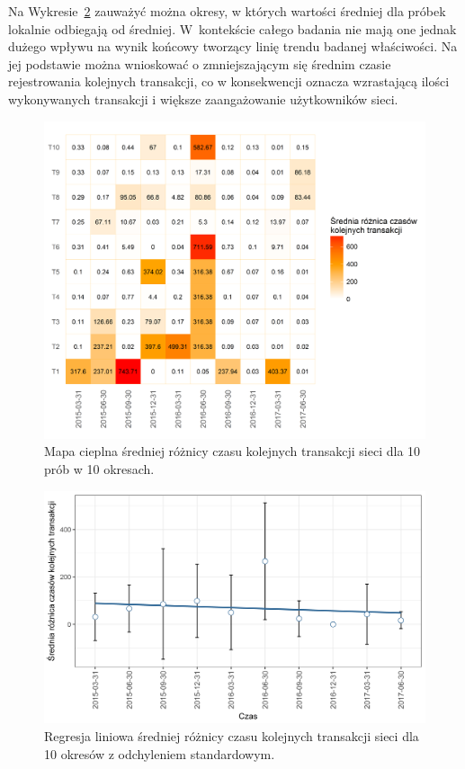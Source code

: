 \documentclass[12pt, oneside, final, openany]{mgr}
\newcommand{\chartsWidth}{0.80}
\begin{document}
\indent Na Wykresie~\ref{fig:rc2} zauważyć można okresy, w których wartości średniej dla próbek lokalnie odbiegają od średniej. W~kontekście całego badania nie mają one jednak dużego wpływu na wynik końcowy tworzący linię trendu badanej właściwości. Na jej podstawie można wnioskować o zmniejszającym się średnim czasie rejestrowania kolejnych transakcji, co w konsekwencji oznacza wzrastającą ilości wykonywanych transakcji i większe zaangażowanie użytkowników sieci. 
 
\begin{figure}[H]
\centering
   \includegraphics[width=\chartsWidth\linewidth]{pictures/roznica_czasow/roznica_czasow_hm.png}
   \caption{Mapa cieplna średniej różnicy czasu kolejnych transakcji sieci dla 10 prób w 10 okresach.}
   \label{fig:rc1} 
\end{figure}
\begin{figure}[H]
\centering
   \includegraphics[width=\chartsWidth\linewidth]{pictures/roznica_czasow/roznica_czasow_sda.png}
   \caption{Regresja liniowa średniej różnicy czasu kolejnych transakcji sieci dla 10 okresów z odchyleniem standardowym.}
   \label{fig:rc2}
\end{figure}
\end{document}
